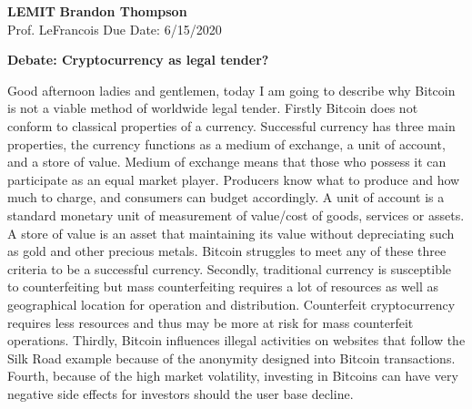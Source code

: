 \documentclass[12pt]{article}
\begin{document}
\noindent
\textbf{LEMIT} \hfill \textbf{Brandon Thompson} \\
\normalsize Prof. LeFrancois \hfill Due Date: 6/15/2020 \\

\begin{center}
\textbf{Debate: Cryptocurrency as legal tender?}
\end{center}
	
	Good afternoon ladies and gentlemen, today I am going to describe why Bitcoin is 
	not a viable method of worldwide legal tender. Firstly Bitcoin does not conform to
	classical properties of a currency. Successful currency has three main properties,
	the currency functions as a medium of exchange, a unit of account, and a store of
	value. Medium of exchange means that those who possess it can participate as an equal
	market player. Producers know what to produce and how much to charge, and consumers
	can budget accordingly.\autocite{med}
	A unit of account is a standard monetary unit of measurement
	of value/cost of goods, services or assets.
	\autocite{unit}
	A store of value is an asset that
	maintaining its value without depreciating such as gold and other precious metals.
	\autocite{store}
	Bitcoin struggles to meet any of these three criteria to be a successful currency.
	Secondly, traditional currency is susceptible to counterfeiting but mass counterfeiting
	requires a lot of resources as well as geographical location for operation and
	distribution. Counterfeit cryptocurrency requires less resources and thus may be
	more at risk for mass counterfeit operations. 
	Thirdly, Bitcoin influences illegal activities on websites that follow
	the Silk Road example because of the anonymity designed into Bitcoin transactions.
	Fourth, because of the high market volatility, investing in Bitcoins can have very
	negative side effects for investors should the user base decline.
\end{document}
